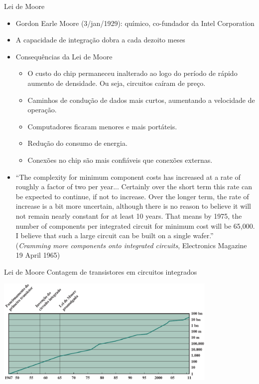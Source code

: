 \begin{slide}[toc=]{Lei de Moore}
\begin{itemize}
   \item Gordon Earle Moore (3/jan/1929): químico, co-fundador da Intel Corporation
   \item A capacidade de integração dobra a cada dezoito meses
   \item Consequências da Lei de Moore
	   \begin{itemize}
		   \item O custo do chip permaneceu inalterado ao logo do período de rápido aumento de densidade. Ou seja, circuitos caíram de preço.
		   \item Caminhos de condução de dados mais curtos, aumentando a velocidade de operação.
		   \item Computadores ficaram menores e mais portáteis.
		   \item Redução do consumo de energia.
	           \item Conexões no chip são mais confiáveis que conexões externas.
	   \end{itemize}
   \item \footnotesize{``The complexity for minimum component costs has increased at a rate of roughly a factor of two per year... Certainly over the short term this rate can be expected to continue, if not to increase. Over the longer term, the rate of increase is a bit more uncertain, although there is no reason to believe it will not remain nearly constant for at least 10 years. That means by 1975, the number of components per integrated circuit for minimum cost will be 65,000. I believe that such a large circuit can be built on a single wafer.''\\(\emph{Cramming more components onto integrated circuits}, Electronics Magazine 19 April 1965)}
\end{itemize}
\end{slide}


\begin{slide}[toc=]{Lei de Moore}
	Contagem de transistores em circuitos integrados
\begin{center}
   \includegraphics[width=0.8\textwidth]{figs/moore2} 
\end{center}
\end{slide}


